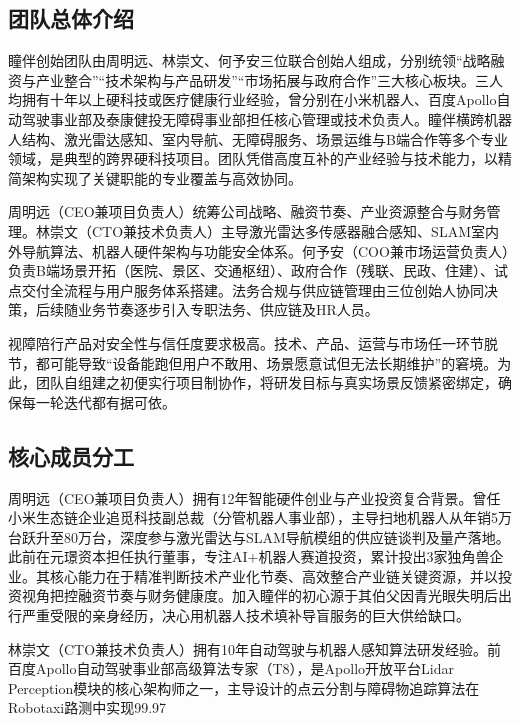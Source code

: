 \documentclass[a4paper,fontset=none]{ctexart}
\begin{document}
\subsection{团队总体介绍}

瞳伴创始团队由周明远、林崇文、何予安三位联合创始人组成，分别统领“战略融资与产业整合”“技术架构与产品研发”“市场拓展与政府合作”三大核心板块。三人均拥有十年以上硬科技或医疗健康行业经验，曾分别在小米机器人、百度Apollo自动驾驶事业部及泰康健投无障碍事业部担任核心管理或技术负责人。瞳伴横跨机器人结构、激光雷达感知、室内导航、无障碍服务、场景运维与B端合作等多个专业领域，是典型的跨界硬科技项目。团队凭借高度互补的产业经验与技术能力，以精简架构实现了关键职能的专业覆盖与高效协同。

周明远（CEO兼项目负责人）统筹公司战略、融资节奏、产业资源整合与财务管理。林崇文（CTO兼技术负责人）主导激光雷达多传感器融合感知、SLAM室内外导航算法、机器人硬件架构与功能安全体系。何予安（COO兼市场运营负责人）负责B端场景开拓（医院、景区、交通枢纽）、政府合作（残联、民政、住建）、试点交付全流程与用户服务体系搭建。法务合规与供应链管理由三位创始人协同决策，后续随业务节奏逐步引入专职法务、供应链及HR人员。

视障陪行产品对安全性与信任度要求极高。技术、产品、运营与市场任一环节脱节，都可能导致“设备能跑但用户不敢用、场景愿意试但无法长期维护”的窘境。为此，团队自组建之初便实行项目制协作，将研发目标与真实场景反馈紧密绑定，确保每一轮迭代都有据可依。

\subsection{核心成员分工}

周明远（CEO兼项目负责人）拥有12年智能硬件创业与产业投资复合背景。曾任小米生态链企业追觅科技副总裁（分管机器人事业部），主导扫地机器人从年销5万台跃升至80万台，深度参与激光雷达与SLAM导航模组的供应链谈判及量产落地。此前在元璟资本担任执行董事，专注AI+机器人赛道投资，累计投出3家独角兽企业。其核心能力在于精准判断技术产业化节奏、高效整合产业链关键资源，并以投资视角把控融资节奏与财务健康度。加入瞳伴的初心源于其伯父因青光眼失明后出行严重受限的亲身经历，决心用机器人技术填补导盲服务的巨大供给缺口。

林崇文（CTO兼技术负责人）拥有10年自动驾驶与机器人感知算法研发经验。前百度Apollo自动驾驶事业部高级算法专家（T8），是Apollo开放平台Lidar Perception模块的核心架构师之一，主导设计的点云分割与障碍物追踪算法在Robotaxi路测中实现99.97%
\end{document}
